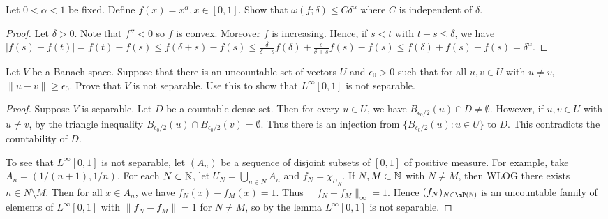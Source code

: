 \documentclass{article}
\begin{document}
 Let $0 < \alpha < 1$ be fixed. Define $f(x) = x^\alpha, x \in [0,1]$. Show that $\omega(f; \delta) \le C \delta^\alpha$ where $C$ is independent of $\delta$.
\begin{proof}
Let $\delta > 0$. Note that $f'' < 0$ so $f$ is convex.  Moreover $f$ is increasing. Hence, if $s < t$ with $t - s \le \delta$, we have $|f(s) - f(t)| = f(t) - f(s) \le f(\delta + s) - f(s) \le \frac {\delta} {\delta + s} f(\delta) + \frac {s} {\delta + s} f(s) - f(s) \le f(\delta) + f(s) - f(s) = \delta^\alpha$.
\end{proof}

 Let $V$ be a Banach space. Suppose that there is an uncountable set of vectors $U$ and $\epsilon_0 > 0$ such that for all $u,v \in U$ with $u \neq v$, $\|u - v\| \ge \epsilon_0$. Prove that $V$ is not separable. Use this to show that $L^\infty[0,1]$ is not separable.
\begin{proof}
Suppose $V$ is separable.  Let $D$ be a countable dense set.  Then for every $u \in U$, we have $B_{\epsilon_0/2}(u) \cap D \neq \emptyset$.  However, if $u,v \in U$ with $u \neq v$, by the triangle inequality $B_{\epsilon_0/2}(u) \cap B_{\epsilon_0/2}(v) = \emptyset$. Thus there is an injection from $\{B_{\epsilon_0/2}(u) : u \in U \}$ to $D$. This contradicts the countability of $D$.

To see that $L^\infty[0,1]$ is not separable, let $(A_n)$ be a sequence of disjoint subsets of $[0,1]$ of positive measure.  For example, take $A_n = (1/(n+1), 1/n)$.  For each $N \subset \mathbb{N}$, let $U_N = \bigcup_{n \in N} A_n$ and $f_N = \chi_{U_N}$.   If $N, M \subset \mathbb{N}$ with $N \neq M$, then WLOG there exists $n \in N \setminus M$.  Then for all $x \in A_n$, we have $f_N(x) - f_M(x) = 1$.  Thus $\|f_N - f_M\|_\infty = 1$.  Hence $(f_N)_{N \in \mP(\N)}$ is an uncountable family of elements of $L^\infty[0,1]$ with $\|f_N - f_M\| = 1$ for $N \neq M$, so by the lemma $L^\infty[0,1]$ is not separable.
\end{proof}
\end{document}
